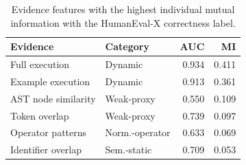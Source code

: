 \begin{table}[!htbp]
\centering
\scriptsize
\begin{tabular}{llrr}
\toprule
Evidence & Category & AUC & MI \\
\midrule
Full execution & Dynamic & 0.934 & 0.411 \\
Example execution & Dynamic & 0.913 & 0.361 \\
AST node similarity & Weak-proxy & 0.550 & 0.109 \\
Token overlap & Weak-proxy & 0.739 & 0.097 \\
Operator patterns & Norm.-operator & 0.633 & 0.069 \\
Identifier overlap & Sem.-static & 0.709 & 0.053 \\
\bottomrule
\end{tabular}
\vspace{0.5em}
\caption{Evidence features with the highest individual mutual information with the HumanEval-X correctness label.}
\label{tab:evidence-informativeness}
\end{table}
